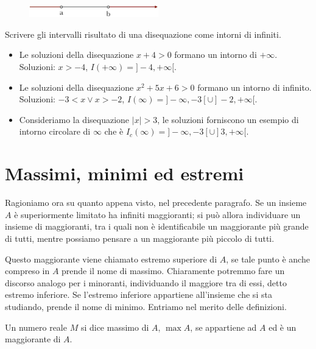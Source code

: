 \begin{figure}[h!]
  \centering
  \includegraphics[width=0.5\textwidth]{img/top_6.png}%
\end{figure}

\begin{esempio} Scrivere gli intervalli risultato di una disequazione come 
intorni di infiniti.
\begin{itemize}
  \item[a)] Le soluzioni della disequazione \(x+4>0\) formano un intorno 
di \(+\infty\).  Soluzioni: \(x>-4\), \(I(+\infty)=]-4, +\infty[\).
  \item[b)] Le soluzioni della disequazione \(x^2+5x+6>0\) formano un 
intorno di infinito. Soluzioni: \(-3<x\lor x>-2\), \(I(\infty)=]-\infty, -3[ 
\cup]-2, +\infty[\).
  \item[c)] Consideriamo la disequazione \(\vert x\vert>3\), le soluzioni 
forniscono un esempio di intorno circolare di \(\infty\) che è 
\(I_c(\infty)=]-\infty,-3[\cup]3,+\infty[\).
\end{itemize} 
\end{esempio}

\section{Massimi, minimi ed estremi}
Ragioniamo ora su quanto appena visto, nel precedente paragrafo. Se un 
insieme \(A\) è superiormente limitato ha infiniti maggioranti; si può allora 
individuare un insieme di maggioranti, tra i quali non è identificabile un 
maggiorante più grande di tutti, mentre possiamo pensare a un maggiorante più 
piccolo di tutti.

Questo maggiorante viene chiamato estremo superiore di \(A\), se tale punto è 
anche compreso in \(A\) prende il nome di massimo. Chiaramente potremmo fare 
un discorso analogo per i minoranti, individuando il maggiore tra di essi, 
detto estremo inferiore. Se l'estremo inferiore appartiene all'insieme che si 
sta studiando, prende il nome di minimo. Entriamo nel merito delle 
definizioni.

\begin{definizione}
  Un numero reale \(M\) si dice massimo di \(A\), \(\max{A}\), se appartiene 
ad \(A\) ed è un maggiorante di \(A\).
\end{definizione}

